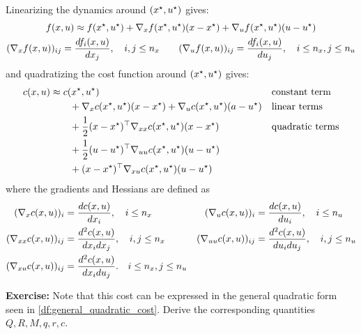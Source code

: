 \documentclass[\main/main]{subfiles}
\begin{document}
Linearizing the dynamics around $(x^\star, u^\star)$ gives:
\begin{gather*}
    f(x, u) \approx f(x^\star, u^\star) + \nabla_x f(x^\star, u^\star) (x - x^\star) + \nabla_u f(x^\star, u^\star) (u - u^\star) \\
    (\nabla_x f(x, u))_{ij} = \frac{d f_i(x, u)}{d x_j}, \quad i, j \le n_x \qquad (\nabla_u f(x, u))_{ij} = \frac{d f_i(x, u)}{d u_j}, \quad i \le n_x, j \le n_u
\end{gather*}
and quadratizing the cost function around $(x^\star, u^\star)$ gives:
\begin{align*}
    c(x, u) &\approx c(x^\star, u^\star) && \text{constant term} \\
    &\qquad + \nabla_x c(x^\star, u^\star) (x - x^\star) + \nabla_u c(x^\star, u^\star) (a - u^\star) && \text{linear terms} \\
    &\qquad + \frac{1}{2} (x - x^\star)^\top \nabla_{x x} c(x^\star, u^\star) (x - x^\star) && \text{quadratic terms} \\
    &\qquad + \frac{1}{2} (u - u^\star)^\top \nabla_{u u} c(x^\star, u^\star) (u - u^\star) \\
    &\qquad + (x - x^\star)^\top \nabla_{x u} c(x^\star, u^\star) (u - u^\star)
\end{align*}
where the gradients and Hessians are defined as
\begin{align*}
    (\nabla_x c(x, u))_{i} &= \frac{d c(x, u)}{d x_i}, \quad i \le n_x
    & (\nabla_u c(x, u))_{i} &= \frac{d c(x, u)}{d u_i}, \quad i \le n_u \\
    (\nabla_{x x} c(x, u))_{ij} &= \frac{d^2 c(x, u)}{d x_i d x_j}, \quad i, j \le n_x
    & (\nabla_{u u} c(x, u))_{ij} &= \frac{d^2 c(x, u)}{d u_i d u_j}, \quad i, j \le n_u \\
    (\nabla_{x u} c(x, u))_{ij} &= \frac{d^2 c(x, u)}{d x_i d u_j}. \quad i \le n_x, j \le n_u
\end{align*}

\textbf{Exercise:} Note that this cost can be expressed in the general quadratic form seen in \autoref{df:general_quadratic_cost}. Derive the corresponding quantities $Q, R, M, q, r, c$.
\end{document}
